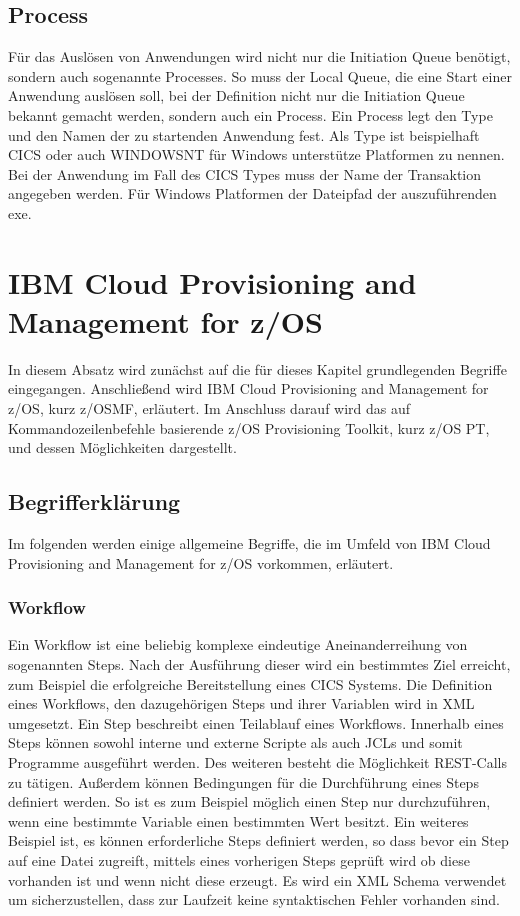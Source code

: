 \subsection{Process}
Für das Auslösen von Anwendungen wird nicht nur die Initiation Queue benötigt, sondern auch sogenannte Processes.
So muss der Local Queue, die eine Start einer Anwendung auslösen soll, bei der Definition nicht nur die Initiation Queue bekannt gemacht werden, sondern auch ein Process.
Ein Process legt den Type und den Namen der zu startenden Anwendung fest.
Als Type ist beispielhaft CICS oder auch WINDOWSNT für Windows unterstütze Platformen zu nennen.
Bei der Anwendung im Fall des CICS Types muss der Name der Transaktion angegeben werden.
Für Windows Platformen der Dateipfad der auszuführenden exe.
\cite{Aranha.2013}

\section{IBM Cloud Provisioning and Management for z/OS}\label{sec:zosmf}
In diesem Absatz wird zunächst auf die für dieses Kapitel grundlegenden Begriffe eingegangen.
Anschließend wird IBM Cloud Provisioning and Management for z/OS, kurz z/OSMF, erläutert.
Im Anschluss darauf wird das auf Kommandozeilenbefehle basierende z/OS Provisioning Toolkit, kurz z/OS PT, und dessen Möglichkeiten dargestellt.

\subsection{Begrifferklärung}
Im folgenden werden einige allgemeine Begriffe, die im Umfeld von IBM Cloud Provisioning and Management for z/OS vorkommen, erläutert.

\subsubsection{Workflow}\label{sssec:workflow}
Ein Workflow ist eine beliebig komplexe eindeutige Aneinanderreihung von sogenannten Steps.
Nach der Ausführung dieser wird ein bestimmtes Ziel erreicht, zum Beispiel die erfolgreiche Bereitstellung eines CICS Systems.
Die Definition eines Workflows, den dazugehörigen Steps und ihrer Variablen wird in XML umgesetzt.
Ein Step beschreibt einen Teilablauf eines Workflows.
Innerhalb eines Steps können sowohl interne und externe Scripte als auch JCLs und somit Programme ausgeführt werden.
Des weiteren besteht die Möglichkeit REST-Calls zu tätigen.
Außerdem können Bedingungen für die Durchführung eines Steps definiert werden.
So ist es zum Beispiel möglich einen Step nur durchzuführen, wenn eine bestimmte Variable einen bestimmten Wert besitzt.
Ein weiteres Beispiel ist, es können erforderliche Steps definiert werden, so dass bevor ein Step auf eine Datei zugreift, mittels eines vorherigen Steps geprüft wird ob diese vorhanden ist und wenn nicht diese erzeugt.
Es wird ein XML Schema verwendet um sicherzustellen, dass zur Laufzeit keine syntaktischen Fehler vorhanden sind.
\cite{Rotthove.2018}

